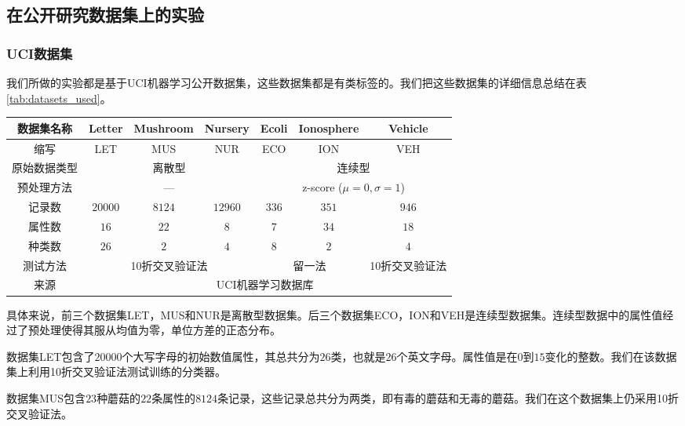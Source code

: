 \subsection{在公开研究数据集上的实验}

\subsubsection{UCI数据集}

我们所做的实验都是基于UCI机器学习公开数据集\cite{Lichman:2013}，这些数据集都是有类标签的。我们把这些数据集的详细信息总结在表\ref{tab:datasets_used}。

\begin{table*}[!t]
\centering
{}
\begin{tabular}{|c|c|c|c|c|c|c|}
\hline
数据集名称 &Letter &Mushroom &Nursery &Ecoli &Ionosphere &Vehicle \\
\hline
\hline
缩写 &LET &MUS &NUR &ECO &ION &VEH\\
\hline
原始数据类型 &
\multicolumn{3}{c|}{离散型}&
\multicolumn{3}{c|}{连续型}\\
\hline
预处理方法 &
\multicolumn{3}{c|}{---}&
\multicolumn{3}{c|}{z-score ($\mu=0,\sigma=1$)}\\
\hline
记录数 &$20000$ &$8124$ &$12960$ &$336$ &$351$ &$946$ \\
\hline
属性数 &$16$ &$22$ &$8$ &$7$ &$34$ &$18$\\
\hline
种类数 &$26$ &$2$ &$4$ &$8$ &$2$ &$4$\\
\hline
测试方法&
\multicolumn{3}{c|}{10折交叉验证法}&
\multicolumn{2}{c|}{留一法}&
10折交叉验证法\\
\hline
来源&
\multicolumn{6}{c|}{UCI机器学习数据库~\cite{Lichman:2013}}\\
\hline
\end{tabular}
\end{table*}

具体来说，前三个数据集LET，MUS和NUR是离散型数据集。后三个数据集ECO，ION和VEH是连续型数据集。连续型数据中的属性值经过了预处理使得其服从均值为零，单位方差的正态分布。

数据集LET包含了$20000$个大写字母的初始数值属性，其总共分为$26$类，也就是$26$个英文字母。属性值是在$0$到$15$变化的整数。我们在该数据集上利用10折交叉验证法测试训练的分类器。

数据集MUS包含$23$种蘑菇的$22$条属性的$8124$条记录，这些记录总共分为两类，即有毒的蘑菇和无毒的蘑菇。我们在这个数据集上仍采用10折交叉验证法。

